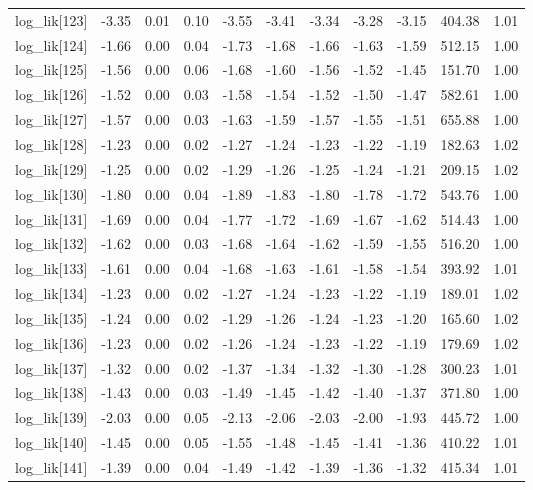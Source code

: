 \begin{table}[ht]
\begin{tabular}{rrrrrrrrrrr}
  log\_lik[123] & -3.35 & 0.01 & 0.10 & -3.55 & -3.41 & -3.34 & -3.28 & -3.15 & 404.38 & 1.01 \\ 
  log\_lik[124] & -1.66 & 0.00 & 0.04 & -1.73 & -1.68 & -1.66 & -1.63 & -1.59 & 512.15 & 1.00 \\ 
  log\_lik[125] & -1.56 & 0.00 & 0.06 & -1.68 & -1.60 & -1.56 & -1.52 & -1.45 & 151.70 & 1.00 \\ 
  log\_lik[126] & -1.52 & 0.00 & 0.03 & -1.58 & -1.54 & -1.52 & -1.50 & -1.47 & 582.61 & 1.00 \\ 
  log\_lik[127] & -1.57 & 0.00 & 0.03 & -1.63 & -1.59 & -1.57 & -1.55 & -1.51 & 655.88 & 1.00 \\ 
  log\_lik[128] & -1.23 & 0.00 & 0.02 & -1.27 & -1.24 & -1.23 & -1.22 & -1.19 & 182.63 & 1.02 \\ 
  log\_lik[129] & -1.25 & 0.00 & 0.02 & -1.29 & -1.26 & -1.25 & -1.24 & -1.21 & 209.15 & 1.02 \\ 
  log\_lik[130] & -1.80 & 0.00 & 0.04 & -1.89 & -1.83 & -1.80 & -1.78 & -1.72 & 543.76 & 1.00 \\ 
  log\_lik[131] & -1.69 & 0.00 & 0.04 & -1.77 & -1.72 & -1.69 & -1.67 & -1.62 & 514.43 & 1.00 \\ 
  log\_lik[132] & -1.62 & 0.00 & 0.03 & -1.68 & -1.64 & -1.62 & -1.59 & -1.55 & 516.20 & 1.00 \\ 
  log\_lik[133] & -1.61 & 0.00 & 0.04 & -1.68 & -1.63 & -1.61 & -1.58 & -1.54 & 393.92 & 1.01 \\ 
  log\_lik[134] & -1.23 & 0.00 & 0.02 & -1.27 & -1.24 & -1.23 & -1.22 & -1.19 & 189.01 & 1.02 \\ 
  log\_lik[135] & -1.24 & 0.00 & 0.02 & -1.29 & -1.26 & -1.24 & -1.23 & -1.20 & 165.60 & 1.02 \\ 
  log\_lik[136] & -1.23 & 0.00 & 0.02 & -1.26 & -1.24 & -1.23 & -1.22 & -1.19 & 179.69 & 1.02 \\ 
  log\_lik[137] & -1.32 & 0.00 & 0.02 & -1.37 & -1.34 & -1.32 & -1.30 & -1.28 & 300.23 & 1.01 \\ 
  log\_lik[138] & -1.43 & 0.00 & 0.03 & -1.49 & -1.45 & -1.42 & -1.40 & -1.37 & 371.80 & 1.00 \\ 
  log\_lik[139] & -2.03 & 0.00 & 0.05 & -2.13 & -2.06 & -2.03 & -2.00 & -1.93 & 445.72 & 1.00 \\ 
  log\_lik[140] & -1.45 & 0.00 & 0.05 & -1.55 & -1.48 & -1.45 & -1.41 & -1.36 & 410.22 & 1.01 \\ 
  log\_lik[141] & -1.39 & 0.00 & 0.04 & -1.49 & -1.42 & -1.39 & -1.36 & -1.32 & 415.34 & 1.01 \\ 

\end{tabular}
\end{table}
